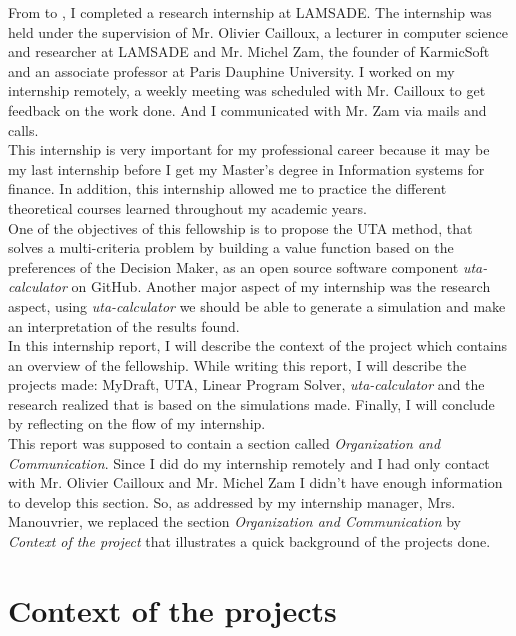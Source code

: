 \documentclass{report}
\begin{document}
From  to , I completed a research internship at LAMSADE. The internship was held under the supervision of Mr. Olivier Cailloux, a lecturer in computer science and researcher at LAMSADE and Mr. Michel Zam, the founder of KarmicSoft and an associate professor at Paris Dauphine University. I worked on my internship remotely, a weekly meeting was scheduled with Mr. Cailloux to get feedback on the work done. And I communicated with Mr. Zam via mails and calls. \\

This internship is very important for my professional career because it may be my last internship before I get my Master’s degree in Information systems for finance.  In addition, this internship allowed me to practice the different theoretical courses learned throughout my academic years.\\

One of the objectives of this fellowship is to propose the UTA method, that solves a multi-criteria problem by building a value function based on the preferences of the Decision Maker, as an open source software component \textit{uta-calculator} on GitHub. Another major aspect of my internship was the research aspect, using \textit{uta-calculator} we should be able to generate a simulation and make an interpretation of the results found.\\

In this internship report, I will describe the context of the project which contains an overview of the fellowship. While writing this report, I will describe the projects made: MyDraft, UTA, Linear Program Solver, \textit{uta-calculator} and the research realized that is based on the simulations made. Finally, I will conclude by reflecting on the flow of my internship. \\

This report was supposed to contain a section called \textit{Organization and Communication}. Since I did do my internship remotely and I had only contact with Mr. Olivier Cailloux and Mr. Michel Zam I didn’t have enough information to develop this section. So, as addressed by my internship manager, Mrs. Manouvrier, we replaced the section \textit{Organization and Communication} by \textit{Context of the project} that illustrates a quick background of the projects done. \\

\chapter{Context of the projects}
\end{document}
